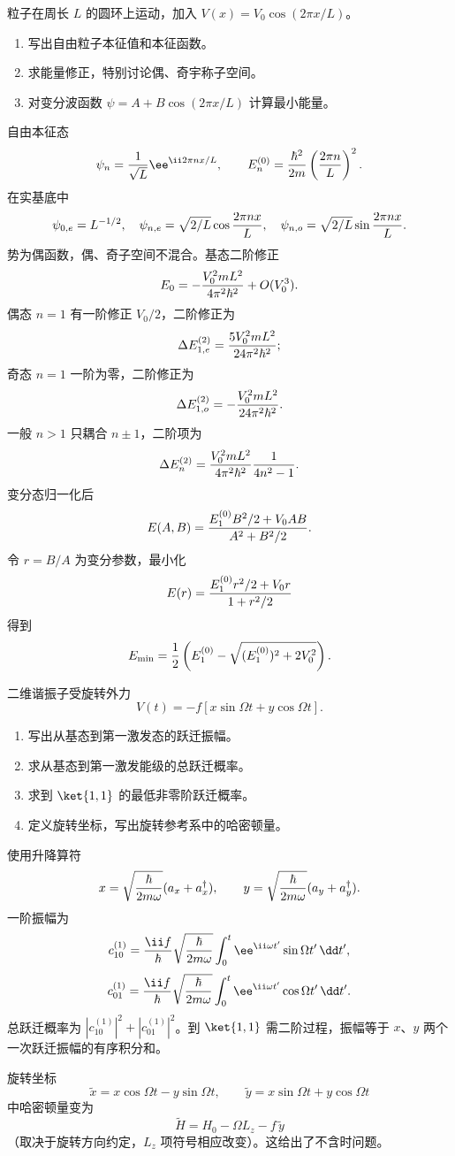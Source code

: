 
\begin{question}
粒子在周长 $L$ 的圆环上运动，加入 $V(x)=V_0\cos(2\pi x/L)$。
\begin{enumerate}
  \item 写出自由粒子本征值和本征函数。
  \item 求能量修正，特别讨论偶、奇宇称子空间。
  \item 对变分波函数 $\psi=A+B\cos(2\pi x/L)$ 计算最小能量。
\end{enumerate}
\begin{solution}
自由本征态
\[
  \psi_n={1\over\sqrt L}\ee^{\ii2\pi nx/L},\qquad
  E_n^{(0)}={\hbar^2\over2m}\left({2\pi n\over L}\right)^2.
\]
在实基底中
\[
  \psi_{0,e}=L^{-1/2},\quad
  \psi_{n,e}=\sqrt{2/L}\cos{2\pi nx\over L},\quad
  \psi_{n,o}=\sqrt{2/L}\sin{2\pi nx\over L}.
\]
势为偶函数，偶、奇子空间不混合。基态二阶修正
\[
  E_0=-{V_0^2mL^2\over4\pi^2\hbar^2}+O(V_0^3).
\]
偶态 $n=1$ 有一阶修正 $V_0/2$，二阶修正为
\[
  \Delta E_{1,e}^{(2)}={5V_0^2mL^2\over24\pi^2\hbar^2};
\]
奇态 $n=1$ 一阶为零，二阶修正为
\[
  \Delta E_{1,o}^{(2)}=-{V_0^2mL^2\over24\pi^2\hbar^2}.
\]
一般 $n>1$ 只耦合 $n\pm1$，二阶项为
\[
  \Delta E_n^{(2)}={V_0^2mL^2\over4\pi^2\hbar^2}{1\over4n^2-1}.
\]
变分态归一化后
\[
  E(A,B)={E_1^{(0)}B^2/2+V_0AB\over A^2+ B^2/2}.
\]
令 $r=B/A$ 为变分参数，最小化
\[
  E(r)={E_1^{(0)}r^2/2+V_0r\over1+r^2/2}
\]
得到
\[
  E_{\min}={1\over2}\left(E_1^{(0)}-\sqrt{(E_1^{(0)})^2+2V_0^2}\right).
\]
\end{solution}
\end{question}

\begin{question}
二维谐振子受旋转外力
\[
  V(t)=-f[x\sin\Omega t+y\cos\Omega t].
\]
\begin{enumerate}
  \item 写出从基态到第一激发态的跃迁振幅。
  \item 求从基态到第一激发能级的总跃迁概率。
  \item 求到 $\ket{1,1}$ 的最低非零阶跃迁概率。
  \item 定义旋转坐标，写出旋转参考系中的哈密顿量。
\end{enumerate}
\begin{solution}
使用升降算符
\[
  x=\sqrt{\hbar\over2m\omega}(a_x+a_x^\dagger),\qquad
  y=\sqrt{\hbar\over2m\omega}(a_y+a_y^\dagger).
\]
一阶振幅为
\[
  c_{10}^{(1)}={\ii f\over\hbar}\sqrt{\hbar\over2m\omega}
  \int_0^t\ee^{\ii\omega t'}\sin\Omega t'\,\dd t',
\]
\[
  c_{01}^{(1)}={\ii f\over\hbar}\sqrt{\hbar\over2m\omega}
  \int_0^t\ee^{\ii\omega t'}\cos\Omega t'\,\dd t' .
\]
总跃迁概率为 $|c_{10}^{(1)}|^2+|c_{01}^{(1)}|^2$。到 $\ket{1,1}$ 需二阶过程，振幅等于 $x$、$y$ 两个一次跃迁振幅的有序积分和。

旋转坐标
\[
  \tilde x=x\cos\Omega t-y\sin\Omega t,\qquad
  \tilde y=x\sin\Omega t+y\cos\Omega t
\]
中哈密顿量变为
\[
  \tilde H=H_0-\Omega L_z-f\,\tilde y
\]
（取决于旋转方向约定，$L_z$ 项符号相应改变）。这给出了不含时问题。
\end{solution}
\end{question}

